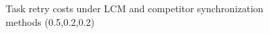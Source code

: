 \documentclass[letter]{sig-alternate}
\begin{document}
\begin{figure}[htbp]
{}
\caption{Task retry costs under LCM and competitor synchronization methods (0.5,0.2,0.2)}
\label{fig:RC_results_0.5_0.2_0.2}
\end{figure}
\end{document}
